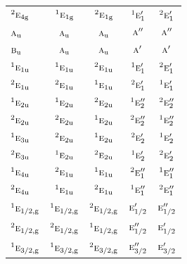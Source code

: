 \documentclass[10pt,a4paper]{article}
\numberwithin{equation}{section}
\newcommand{\irr}[1]{\text{\normalfont\scshape #1}}
\newcommand{\conjpair}[1]{{}^{#1}}
\newcommand{\ptag}[1]{\mathrm{#1}}
\begin{document}
{\begin{longtable}{@{}lcccc@{}}
$\conjpair{2}\irr{e}_{4\ptag{g}}$ & $\conjpair{1}\irr{e}_{1\ptag{g}}$ & $\conjpair{2}\irr{e}_{1\ptag{g}}$ & $\conjpair{1}\irr{e}_{1}'$ & $\conjpair{2}\irr{e}_{1}'$\\
$\irr{a}_{\ptag{u}}$ & $\irr{a}_{\ptag{u}}$ & $\irr{a}_{\ptag{u}}$ & $\irr{a}''$ & $\irr{a}''$\\
$\irr{b}_{\ptag{u}}$ & $\irr{a}_{\ptag{u}}$ & $\irr{a}_{\ptag{u}}$ & $\irr{a}'$ & $\irr{a}'$\\
$\conjpair{1}\irr{e}_{1\ptag{u}}$ & $\conjpair{1}\irr{e}_{1\ptag{u}}$ & $\conjpair{2}\irr{e}_{1\ptag{u}}$ & $\conjpair{1}\irr{e}_{1}'$ & $\conjpair{2}\irr{e}_{1}'$\\
$\conjpair{2}\irr{e}_{1\ptag{u}}$ & $\conjpair{2}\irr{e}_{1\ptag{u}}$ & $\conjpair{1}\irr{e}_{1\ptag{u}}$ & $\conjpair{2}\irr{e}_{1}'$ & $\conjpair{1}\irr{e}_{1}'$\\
$\conjpair{1}\irr{e}_{2\ptag{u}}$ & $\conjpair{1}\irr{e}_{2\ptag{u}}$ & $\conjpair{2}\irr{e}_{2\ptag{u}}$ & $\conjpair{1}\irr{e}_{2}''$ & $\conjpair{2}\irr{e}_{2}''$\\
$\conjpair{2}\irr{e}_{2\ptag{u}}$ & $\conjpair{2}\irr{e}_{2\ptag{u}}$ & $\conjpair{1}\irr{e}_{2\ptag{u}}$ & $\conjpair{2}\irr{e}_{2}''$ & $\conjpair{1}\irr{e}_{2}''$\\
$\conjpair{1}\irr{e}_{3\ptag{u}}$ & $\conjpair{2}\irr{e}_{2\ptag{u}}$ & $\conjpair{1}\irr{e}_{2\ptag{u}}$ & $\conjpair{2}\irr{e}_{2}'$ & $\conjpair{1}\irr{e}_{2}'$\\
$\conjpair{2}\irr{e}_{3\ptag{u}}$ & $\conjpair{1}\irr{e}_{2\ptag{u}}$ & $\conjpair{2}\irr{e}_{2\ptag{u}}$ & $\conjpair{1}\irr{e}_{2}'$ & $\conjpair{2}\irr{e}_{2}'$\\
$\conjpair{1}\irr{e}_{4\ptag{u}}$ & $\conjpair{2}\irr{e}_{1\ptag{u}}$ & $\conjpair{1}\irr{e}_{1\ptag{u}}$ & $\conjpair{2}\irr{e}_{1}''$ & $\conjpair{1}\irr{e}_{1}''$\\
$\conjpair{2}\irr{e}_{4\ptag{u}}$ & $\conjpair{1}\irr{e}_{1\ptag{u}}$ & $\conjpair{2}\irr{e}_{1\ptag{u}}$ & $\conjpair{1}\irr{e}_{1}''$ & $\conjpair{2}\irr{e}_{1}''$\\
$\conjpair{1}\irr{e}_{1/2,\ptag{g}}$ & $\conjpair{1}\irr{e}_{1/2,\ptag{g}}$ & $\conjpair{2}\irr{e}_{1/2,\ptag{g}}$ & $\irr{e}_{1/2}'$ & $\irr{e}_{1/2}''$\\
$\conjpair{2}\irr{e}_{1/2,\ptag{g}}$ & $\conjpair{2}\irr{e}_{1/2,\ptag{g}}$ & $\conjpair{1}\irr{e}_{1/2,\ptag{g}}$ & $\irr{e}_{1/2}''$ & $\irr{e}_{1/2}'$\\
$\conjpair{1}\irr{e}_{3/2,\ptag{g}}$ & $\conjpair{1}\irr{e}_{3/2,\ptag{g}}$ & $\conjpair{2}\irr{e}_{3/2,\ptag{g}}$ & $\irr{e}_{3/2}''$ & $\irr{e}_{3/2}'$\\

\end{longtable}}
\end{document}
